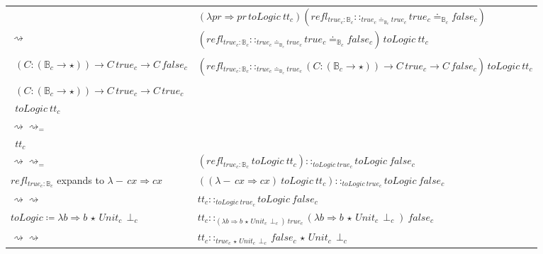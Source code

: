 \begin{sidewaysfigure}
\begin{tabular}{ll}
& $\left(\lambda pr\Rightarrow pr\,toLogic\ tt_{c}\right)\left(refl_{true_{c}:\mathbb{B}_{c}}::_{true_{c}\doteq_{\mathbb{B}_{c}}true_{c}}true_{c}\doteq_{\mathbb{B}_{c}}false_{c}\right)$\tabularnewline
$\rightsquigarrow$ & $\left(refl_{true_{c}:\mathbb{B}_{c}}::_{true_{c}\doteq_{\mathbb{B}_{c}}true_{c}}true_{c}\doteq_{\mathbb{B}_{c}}false_{c}\right)\,toLogic\ tt_{c}$\tabularnewline
\makecell[l]{$true_{c}\doteq_{\mathbb{B}_{c}}false_{c}$ expands to\\
  $\ \ \left(C:\left(\mathbb{B}_{c}\rightarrow\star\right)\right)\rightarrow C\,true_{c}\rightarrow C\,false_{c}$} & $\left(refl_{true_{c}:\mathbb{B}_{c}}::_{true_{c}\doteq_{\mathbb{B}_{c}}true_{c}}\left(C:\left(\mathbb{B}_{c}\rightarrow\star\right)\right)\rightarrow C\,true_{c}\rightarrow C\,false_{c}\right)\,toLogic\ tt_{c}$\tabularnewline
\makecell[l]{$true_{c}\doteq_{\mathbb{B}_{c}}true_{c}$ expands to\\
  $\ \ \left(C:\left(\mathbb{B}_{c}\rightarrow\star\right)\right)\rightarrow C\,true_{c}\rightarrow C\,true_{c}$} & 
  \makecell[l]{$\left(refl_{true_{c}:\mathbb{B}_{c}}::_{\left(C:\left(\mathbb{B}_{c}\rightarrow\star\right)\right)\rightarrow C\,true_{c}\rightarrow C\,true_{c}}\left(C:\left(\mathbb{B}_{c}\rightarrow\star\right)\right)\rightarrow C\,true_{c}\rightarrow C\,false_{c}\right)$\\
  $\ \ toLogic\ tt_{c}$}\tabularnewline

$\rightsquigarrow\rightsquigarrow_{=}$ & \makecell[l]{$\left(\left(refl_{true_{c}:\mathbb{B}_{c}} toLogic\right)::_{toLogic\ true_{c}\rightarrow toLogic\ true_{c}}toLogic\ true_{c}\rightarrow toLogic\ false_{c}\right)$\\
$\ \ tt_{c}$}\tabularnewline

$\rightsquigarrow\rightsquigarrow_{=}$ & $\left(refl_{true_{c}:\mathbb{B}_{c}}\ toLogic\ tt_{c}\right)::_{toLogic\ true_{c}}toLogic\ false_{c}$
\tabularnewline

$refl_{true_{c}:\mathbb{B}_{c}}$ expands to $\lambda-\,cx\Rightarrow cx$ & 
  $\left( \left(\lambda-\,cx\Rightarrow cx \right) \ toLogic\ tt_{c}\right)::_{toLogic\ true_{c}}toLogic\ false_{c}$\tabularnewline
$\rightsquigarrow\rightsquigarrow$ & $tt_{c}::_{toLogic\ true_{c}}toLogic\ false_{c}$\tabularnewline

$toLogic\coloneqq\lambda b\Rightarrow b\,\star\,Unit_{c}\,\perp_{c}$ & 
  $tt_{c}::_{\left(\lambda b\Rightarrow b\,\star\,Unit_{c}\,\perp_{c}\right)\ true_{c}}\left(\lambda b\Rightarrow b\,\star\,Unit_{c}\,\perp_{c}\right)\ false_{c}$
\tabularnewline
$\rightsquigarrow\rightsquigarrow$ & $tt_{c}::_{true_{c}\,\star\,Unit_{c}\,\perp_{c}}false_{c}\,\star\,Unit_{c}\,\perp_{c}$\tabularnewline


\end{tabular}
\end{sidewaysfigure}

